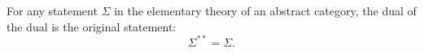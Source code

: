 For any statement $\Sigma$ in the elementary theory of an abstract category, the dual of the dual is the original statement:
$$
\Sigma^{**} = \Sigma.
$$
